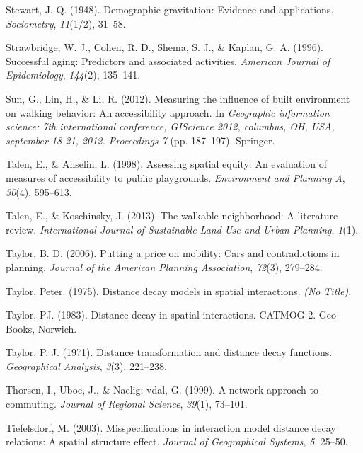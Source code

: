 \documentclass[
11pt, %
oneside, %
english, %
singlespacing, %
]{macthesis} %
\newlength{\cslhangindent}
\newenvironment{CSLReferences}[2] %
 {%
  \setlength{\parindent}{0pt}
  \ifodd #1 \everypar{\setlength{\hangindent}{\cslhangindent}}\ignorespaces\fi
  \ifnum #2 > 0
  \setlength{\parskip}{#2\baselineskip}
  \fi
 }%
 {}
\begin{document}
\begin{CSLReferences}{1}{0}
Stewart, J. Q. (1948). Demographic gravitation: Evidence and applications. \emph{Sociometry}, \emph{11}(1/2), 31--58.

Strawbridge, W. J., Cohen, R. D., Shema, S. J., \& Kaplan, G. A. (1996). Successful aging: Predictors and associated activities. \emph{American Journal of Epidemiology}, \emph{144}(2), 135--141.

Sun, G., Lin, H., \& Li, R. (2012). Measuring the influence of built environment on walking behavior: An accessibility approach. In \emph{Geographic information science: 7th international conference, GIScience 2012, columbus, OH, USA, september 18-21, 2012. Proceedings 7} (pp. 187--197). Springer.

Talen, E., \& Anselin, L. (1998). Assessing spatial equity: An evaluation of measures of accessibility to public playgrounds. \emph{Environment and Planning A}, \emph{30}(4), 595--613.

Talen, E., \& Koschinsky, J. (2013). The walkable neighborhood: A literature review. \emph{International Journal of Sustainable Land Use and Urban Planning}, \emph{1}(1).

Taylor, B. D. (2006). Putting a price on mobility: Cars and contradictions in planning. \emph{Journal of the American Planning Association}, \emph{72}(3), 279--284.

Taylor, Peter. (1975). Distance decay models in spatial interactions. \emph{(No Title)}.

Taylor, PJ. (1983). Distance decay in spatial interactions. CATMOG 2. Geo Books, Norwich.

Taylor, P. J. (1971). Distance transformation and distance decay functions. \emph{Geographical Analysis}, \emph{3}(3), 221--238.

Thorsen, I., Uboe, J., \& Naelig; vdal, G. (1999). A network approach to commuting. \emph{Journal of Regional Science}, \emph{39}(1), 73--101.

Tiefelsdorf, M. (2003). Misspecifications in interaction model distance decay relations: A spatial structure effect. \emph{Journal of Geographical Systems}, \emph{5}, 25--50.


\end{CSLReferences}
\end{document}
